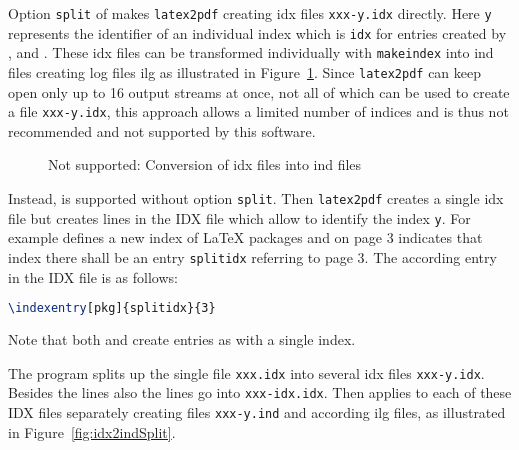 Option \texttt{split} of  makes \texttt{latex2pdf} 
creating \gls{idx} files \texttt{xxx-y.idx} directly. 
Here \texttt{y} represents the identifier of an individual index 
which is \texttt{idx} for entries created by 
,  and . 
These \gls{idx} files can be transformed individually with \texttt{makeindex} 
into \gls{ind} files creating log files \gls{ilg} 
as illustrated in Figure~\ref{fig:idx2indMult}. 
Since \texttt{latex2pdf} can keep open only up to 16 output streams at once, 
not all of which can be used to create a file \texttt{xxx-y.idx}, 
this approach allows a limited number of indices 
and is thus not recommended and not supported by this software. 

\begin{figure}[htb]
  \centering
  \caption{\label{fig:idx2indMult}
  Not supported: Conversion of \gls{idx} files into ind files}
\end{figure}
  

Instead,  is supported without option \texttt{split}. 
Then \texttt{latex2pdf} creates a single \gls{idx} file 
but  
creates lines  in the IDX file 
which allow to identify the index \texttt{y}. 
For example  defines a new index of \LaTeX{} packages 
and  on page 3 indicates 
that index there shall be an entry \texttt{splitidx} referring to page 3. 
The according entry in the IDX file is as follows: 
%
\begin{lstlisting}[language=TeX]
  \indexentry[pkg]{splitidx}{3}
\end{lstlisting}
%
Note that both  and  
create entries  as with a single index. 

The program  splits up the single file \texttt{xxx.idx} 
into several \gls{idx} files \texttt{xxx-y.idx}. 
Besides the lines  
also the lines  go into \texttt{xxx-idx.idx}. 
Then  applies  to each of these IDX files separately 
creating files \texttt{xxx-y.ind} and according \gls{ilg} files, 
as illustrated in Figure~\ref{fig:idx2indSplit}. 

